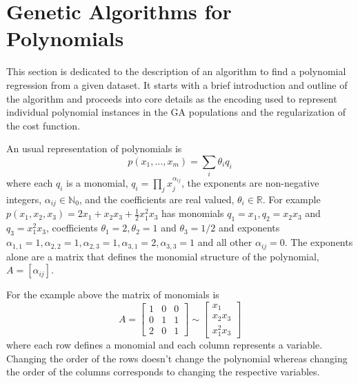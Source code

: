 \documentclass[preprint,authoryear,12pt]{elsarticle}
\begin{document}
\section{Genetic Algorithms for Polynomials}

This section is dedicated to the description of an algorithm to find a polynomial regression from a given dataset. It starts with a brief introduction and outline of the algorithm and proceeds into core details as the encoding used to represent individual polynomial instances in the \ac{GA} populations and the regularization of the cost function.

An usual representation of polynomials is
$$
p\left( x_1, \ldots, x_m\right) = \sum_i \theta_i q_i
$$
where each $q_i$ is a monomial, $q_i = \prod_{j} x_j^{\alpha_{ij}}$, the exponents are non-negative integers, $\alpha_{ij}\in\mathbb{N}_0$, and the coefficients are real valued, $\theta_i \in \mathbb{R}$. For example $p\left( x_1, x_2, x_3 \right) = 2 x_1 + x_2 x_3 + \frac{1}{2} x_1^2 x_3$ has monomials $q_1 = x_1, q_2 = x_2 x_3$ and $q_3 = x_1^2 x_3$, coefficients $\theta_1 = 2, \theta_2 = 1$ and $\theta_3 = 1/2$ and exponents $\alpha_{1,1} = 1, \alpha_{2,2}=1, \alpha_{2,3} = 1, \alpha_{3,1} = 2, \alpha_{3,3} = 1$ and all other $\alpha_{ij} = 0$. The exponents alone are a matrix that defines the monomial structure of the polynomial, $A = \left[\alpha_{ij}\right]$.

For the example above the matrix of monomials is
$$
A = \left[ 
\begin{array}{ccc}
1 & 0 & 0 \\
0 & 1 & 1 \\
2 & 0 & 1
\end{array}
\right] \sim 
\left[ 
\begin{array}{ccc}
x_1 \\
x_2 x_3 \\
x_1^2 x_3
\end{array}
\right]
$$
where each row defines a monomial and each column represents a variable. Changing the order of the rows doesn't change the polynomial whereas changing the order of the columns corresponds to changing the respective variables.
\end{document}
